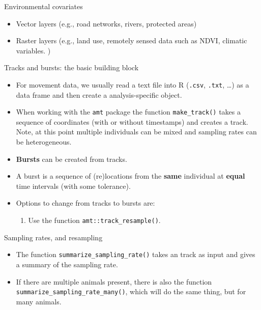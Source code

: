 \documentclass[ignorenonframetext,,t]{beamer}
\let\oldtextbf\textbf
\renewcommand{\textbf}[1]{\textcolor{spamwell}{\oldtextbf{#1}}}
\providecommand{\tightlist}{%
\setlength{\itemsep}{0pt}\setlength{\parskip}{0pt}}
\providecommand{\tightlist}{%
\setlength{\itemsep}{0pt}\setlength{\parskip}{0pt}}
\renewcommand{\tightlist}{\setlength{\itemsep}{1.4ex}\setlength{\parskip}{0pt}}
\begin{document}
\begin{frame}
\begin{block}{Environmental covariates}
\protect\hypertarget{environmental-covariates}{}
\begin{itemize}
\tightlist
\item
  Vector layers (e.g., road networks, rivers, protected areas)
\item
  Raster layers (e.g., land use, remotely sensed data such as NDVI,
  climatic variables. )
\end{itemize}
\end{block}
\end{frame}

\begin{frame}[fragile]{Tracks and bursts: the basic building block}
\protect\hypertarget{tracks-and-bursts-the-basic-building-block}{}
\begin{itemize}
\item
  For movement data, we usually read a text file into R (\texttt{.csv},
  \texttt{.txt}, \ldots) as a data frame and then create a
  analysis-specific object.
\item
  When working with the \texttt{amt} package the function
  \texttt{make\_track()} takes a sequence of coordinates (with or
  without timestamps) and creates a track. Note, at this point multiple
  individuals can be mixed and sampling rates can be heterogeneous.
\end{itemize}
\end{frame}

\begin{frame}[fragile]
\begin{itemize}
\tightlist
\item
  \textbf{Bursts} can be created from tracks.
\item
  A burst is a sequence of (re)locations from the \textbf{same}
  individual at \textbf{equal} time intervals (with some tolerance).
\item
  Options to change from tracks to bursts are:

  \begin{enumerate}
  \tightlist
  \item
    Use the function \texttt{amt::track\_resample()}.
  \end{enumerate}
\end{itemize}
\end{frame}

\begin{frame}[fragile]{Sampling rates, and resampling}
\protect\hypertarget{sampling-rates-and-resampling}{}
\begin{itemize}
\tightlist
\item
  The function \texttt{summarize\_sampling\_rate()} takes an track as
  input and gives a summary of the sampling rate.
\item
  If there are multiple animals present, there is also the function
  \texttt{summarize\_sampling\_rate\_many()}, which will do the same
  thing, but for many animals.
\end{itemize}
\end{frame}
\end{document}
